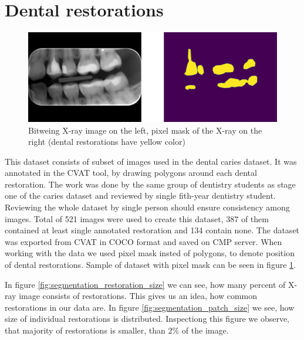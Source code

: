 \section{Dental restorations}
\begin{figure}
    \centering
    \includegraphics[width=\linewidth]{images/segmentation_ds_sample.pdf}
    \caption{Bitweing X-ray image on the left, pixel mask of the X-ray on the right (dental restorations have yellow color)}
    \label{fig:segmentation_sample}
\end{figure}
This dataset consists of subset of images used in the dental caries dataset. It was annotated in the CVAT tool, by drawing polygons around each dental restoration. The work was done by the same group of dentistry students as stage one of the caries dataset and reviewed by single fith-year dentistry student. Reviewing the whole dataset by single person should ensure consistency among images. Total of 521 images were used to create this dataset, 387 of them contained at least single annotated restoration and 134 contain none.
The dataset was exported from CVAT in COCO format and saved on CMP server. When working with the data we used pixel mask insted of polygons, to denote position of dental restorations. Sample of dataset with pixel mask can be seen in figure \ref{fig:segmentation_sample}.

In figure \ref{fig:segmentation_restoration_size} we can see, how many percent of X-ray image consists of restorations. This gives us an idea, how common restorations in our data are. In figure \ref{fig:segmentation_patch_size} we see, how size of individual restorations is distributed. Inspectiong this figure we observe, that majority of restorations is smaller, than $2\%$ of the image.

